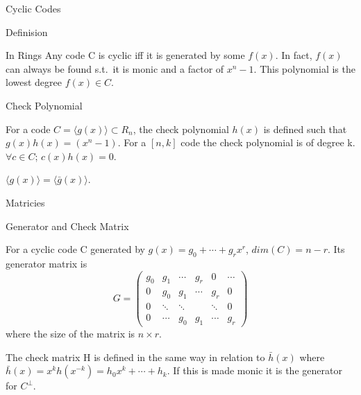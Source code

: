 \documentclass[12pt, letterpaper]{article}
\begin{document}
\begin{section}{Cyclic Codes}
\begin{subsection}{Definision}
\begin{subsubsection}{In Rings}
      Any code C is cyclic iff it is generated by some \(f(x)\). In fact,
      \(f(x)\) can always be found s.t.\ it is monic and a factor of
      \(x^{n} - 1\). This polynomial is the lowest degree \(f(x) \in C\).

    \end{subsubsection}

    \begin{subsubsection}{Check Polynomial}

      For a code \(C = \langle g(x) \rangle \subset R_{n}\), the check
      polynomial \(h(x)\) is defined such that \(g(x)h(x) = (x^{n} - 1)\). For a
      \([n, k]\) code the check polynomial is of degree k. \\
      \(\forall c \in C\); \(c(x) h(x) = 0\).

      \(\langle g(x) \rangle = \langle \bar{g}(x) \rangle\).

    \end{subsubsection}

  \end{subsection}

  \begin{subsection}{Matricies}

    \begin{subsubsection}{Generator and Check Matrix}

      For a cyclic code C generated by \(g(x) = g_{0} + \cdots + g_{r}x^{r}\),
      \(dim(C) = n - r\). Its generator matrix is \[G =
        \begin{pmatrix}
          g_{0} & g_{1} & \cdots & g_{r} & 0 & \cdots \\
          0 & g_{0} & g_{1} & \cdots & g_{r} & 0 \\
          0 & \ddots & \ddots & & \ddots & 0 \\
          0 & \cdots & g_{0} & g_{1} & \cdots & g_{r}
        \end{pmatrix}
      \]
      where the size of the matrix is \(n \times r\).

      The check matrix H is defined in the same way in relation to
      \(\bar{h}(x)\) where \(\bar{h}(x) = x^{k}h(x^{-k}) =
      h_{0}x^{k} + \cdots + h_{k}\). If this is made monic it is the generator
      for \(C^{\bot}\).


    \end{subsubsection}

  \end{subsection}

\end{section}
\end{document}

